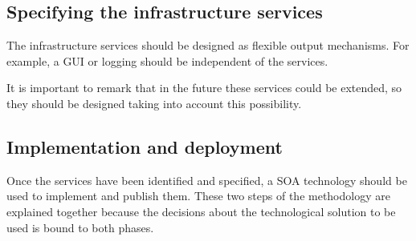 \subsection{Specifying the infrastructure services}
The infrastructure services should be designed as flexible output mechanisms. For example, a GUI or logging should be independent of the services. 














It is important to remark that in the future these services could be extended, so they should be designed taking into account this possibility.

\subsection{Implementation and deployment}
\label{subsec:soaea:implementation}
Once the services have been identified and specified, a SOA technology should be used to implement and publish them. These two steps of the methodology are explained together because the decisions about the technological solution to be used is bound to both phases.

